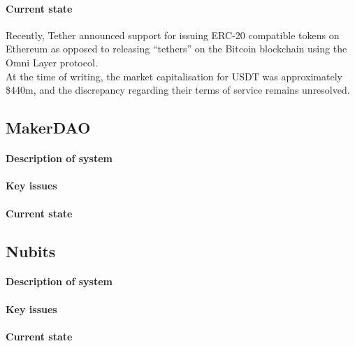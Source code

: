 \paragraph{Current state}

Recently, Tether announced support for issuing ERC-20 compatible tokens on Ethereum as opposed to releasing ``tethers'' on the Bitcoin blockchain using the Omni Layer protocol. \\

\noindent At the time of writing, the market capitalisation for USDT was approximately \$440m, and the discrepancy regarding their terms of service remains unresolved. \\


\subsection{MakerDAO}

\paragraph{Description of system}

\paragraph{Key issues}

\paragraph{Current state}

\subsection{Nubits}

\paragraph{Description of system}

\paragraph{Key issues}

\paragraph{Current state}

\pagebreak